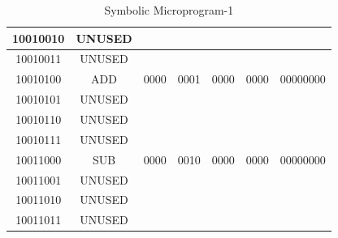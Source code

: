 \documentclass[pdftex,12pt,a4paper]{article}
\begin{document}
\begin{table}[h]
\begin{tabular}{|c|c|c|c|c|c|c|}
10010010 &	UNUSED  &&&&&\\ \hline
10010011 &	UNUSED  &&&&&\\ \hline
10010100 &	ADD	    &	0000 &		0001 &		0000 &		0000	 &		00000000\\ \hline
10010101 &	UNUSED  &&&&&\\ \hline
10010110 &	UNUSED  &&&&&\\ \hline
10010111 &	UNUSED  &&&&&\\ \hline
10011000 &	SUB	    &	0000 &		0010 &		0000 &		0000	 &		00000000\\ \hline
10011001 &	UNUSED  &&&&&\\ \hline
10011010 &	UNUSED  &&&&&\\ \hline
10011011 &	UNUSED  &&&&&\\ \hline
    \end{tabular}
    \caption{Symbolic Microprogram-1}
    \label{mp1}
\end{table}
\end{document}
